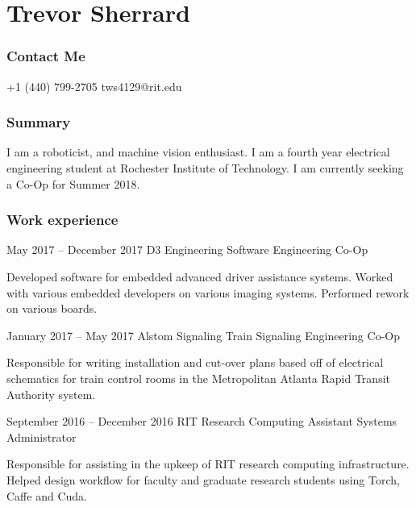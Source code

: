 \documentclass{tccv}
\begin{document}
\part{Trevor Sherrard}
\section{Contact Me}
\begin{eventlist}
    {+1 (440) 799-2705}
    {tws4129@rit.edu}
    
\end{eventlist}

\section{Summary}
I am a roboticist, and machine vision enthusiast. I am a fourth year electrical engineering student at Rochester Institute of Technology. I am currently seeking a Co-Op for Summer 2018. 

\section{Work experience}

\begin{eventlist}

\item{May 2017 -- December 2017}
     {D3 Engineering}
     {Software Engineering Co-Op}
     
Developed software for embedded advanced driver assistance systems. Worked with various embedded developers on various imaging systems. Performed rework on various boards.

\item{January 2017 -- May 2017}
     {Alstom Signaling}
     {Train Signaling Engineering Co-Op}

Responsible for writing installation and cut-over plans based off of electrical schematics for train control rooms in the Metropolitan Atlanta Rapid Transit Authority system.

\item{September 2016 -- December 2016}
	 {RIT Research Computing}
	 {Assistant Systems Administrator}
	 
Responsible for assisting in the upkeep of RIT research computing infrastructure. Helped design workflow for faculty and graduate research students using Torch, Caffe and Cuda. 

\end{eventlist}
\end{document}
